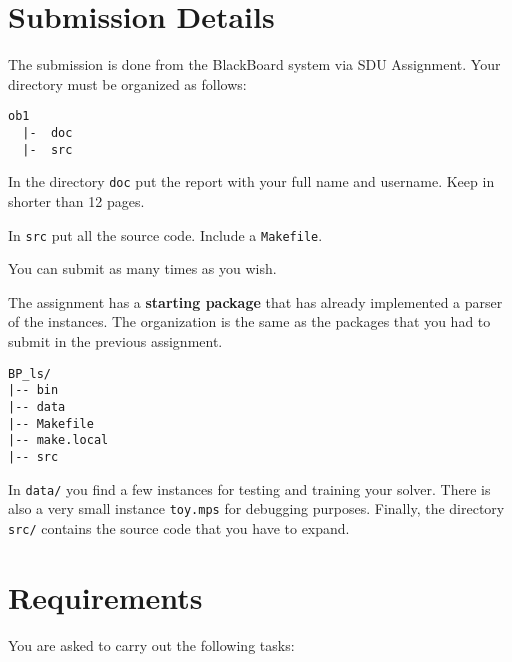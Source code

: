 

\section*{Submission Details}

The submission is done from the BlackBoard system via SDU Assignment.
Your directory must be organized as follows:
\begin{verbatim}
ob1
  |-  doc
  |-  src
\end{verbatim}
In the directory \verb=doc= put the report with your full name and
username. Keep in shorter than 12 pages.

In \verb=src= put all the source code. Include a \verb=Makefile=.
%
%
%


You can submit as many times as you wish. 




\clearpage


The assignment has a
\textbf{starting package} that has already implemented a parser of the
instances. The organization is the same as the packages that you had to
submit in the previous assignment.

\begin{verbatim}
BP_ls/ 
|-- bin
|-- data
|-- Makefile
|-- make.local
|-- src
\end{verbatim}

In \verb=data/= you find a few instances for testing and training your
solver. There is also a very small instance \verb=toy.mps= for debugging
purposes. Finally, the directory \verb=src/= contains the source code
that you have to expand.





\section*{Requirements}
\label{requirements}


You are asked to carry out the following tasks: 

